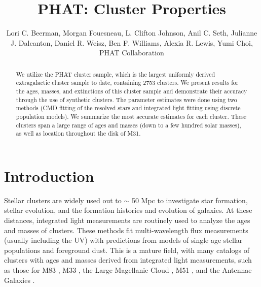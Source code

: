 \documentclass{emulateapj}
\begin{document}
\title{PHAT:  Cluster Properties}
\author{Lori C. Beerman, Morgan Fouesneau, L. Clifton Johnson, Anil C. Seth, Julianne J. Dalcanton, Daniel R. Weisz, Ben F. Williams, Alexia R. Lewis, Yumi Choi, PHAT Collaboration} 


\begin{abstract}

We utilize the PHAT cluster sample, which is the largest uniformly derived extragalactic cluster sample to date, containing 2753 clusters.  We present results for the ages, masses, and extinctions of this cluster sample and demonstrate their accuracy through the use of synthetic clusters.  The parameter estimates were done using two  methods (CMD fitting of the resolved stars and integrated light fitting using discrete population models).  We summarize the most accurate estimates for each cluster.  These clusters span a large range of ages and masses (down to a few hundred solar masses), as well as location throughout the disk of M31.

\end{abstract}


\vfill
\clearpage


\section{Introduction}\label{intro}


Stellar clusters are widely used out to $\sim$ 50 Mpc to investigate star formation, stellar evolution, and the formation histories and evolution of galaxies.  At these distances, integrated light measurements are routinely used to analyze the ages and masses of clusters.  These methods fit multi-wavelength flux measurements (usually including the UV) with predictions from models of single age stellar populations and foreground dust.  This is a mature field, with many catalogs of clusters with ages and masses derived from integrated light measurements, such as those for M83 \citep{Bastian12}, M33 \citep{SanRoman10}, the Large Magellanic Cloud \citep[LMC; ][] {Hunter03, Popescu12}, M51 \citep{Chandar11}, and the Antennae Galaxies \citep{Whitmore10}.  
\end{document}
